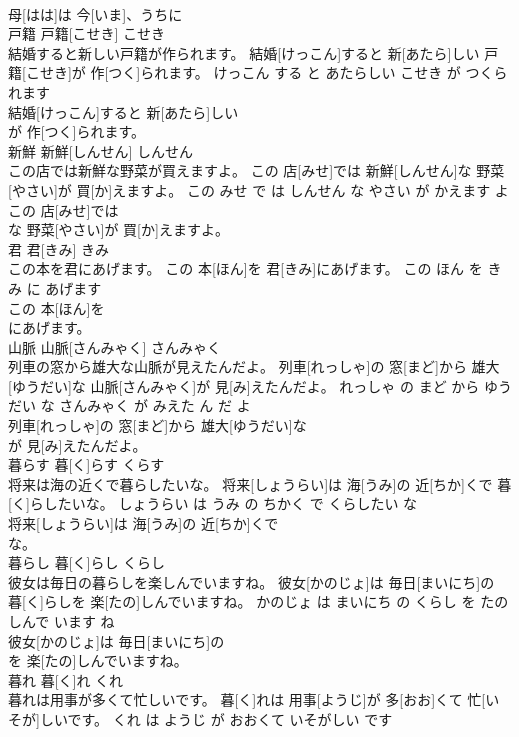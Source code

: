 \documentclass[8pt]{extreport}
\begin{document}
\begin{CJK}{UTF8}{min}
\\	母[はは]は 今[いま]、うちに
\\	戸籍	戸籍[こせき]	こせき	
\\	結婚すると新しい戸籍が作られます。	結婚[けっこん]すると 新[あたら]しい 戸籍[こせき]が 作[つく]られます。	けっこん する と あたらしい こせき が つくられます	
\\	結婚[けっこん]すると 新[あたら]しい
\\	が 作[つく]られます。			
\\	新鮮	新鮮[しんせん]	しんせん	
\\	この店では新鮮な野菜が買えますよ。	この 店[みせ]では 新鮮[しんせん]な 野菜[やさい]が 買[か]えますよ。	この みせ で は しんせん な やさい が かえます よ	
\\	この 店[みせ]では
\\	な 野菜[やさい]が 買[か]えますよ。			
\\	君	君[きみ]	きみ	
\\	この本を君にあげます。	この 本[ほん]を 君[きみ]にあげます。	この ほん を きみ に あげます	
\\	この 本[ほん]を
\\	にあげます。			
\\	山脈	山脈[さんみゃく]	さんみゃく	
\\	列車の窓から雄大な山脈が見えたんだよ。	列車[れっしゃ]の 窓[まど]から 雄大[ゆうだい]な 山脈[さんみゃく]が 見[み]えたんだよ。	れっしゃ の まど から ゆうだい な さんみゃく が みえた ん だ よ	
\\	列車[れっしゃ]の 窓[まど]から 雄大[ゆうだい]な
\\	が 見[み]えたんだよ。			
\\	暮らす	暮[く]らす	くらす	
\\	将来は海の近くで暮らしたいな。	将来[しょうらい]は 海[うみ]の 近[ちか]くで 暮[く]らしたいな。	しょうらい は うみ の ちかく で くらしたい な	
\\	将来[しょうらい]は 海[うみ]の 近[ちか]くで
\\	な。			
\\	暮らし	暮[く]らし	くらし	
\\	彼女は毎日の暮らしを楽しんでいますね。	彼女[かのじょ]は 毎日[まいにち]の 暮[く]らしを 楽[たの]しんでいますね。	かのじょ は まいにち の くらし を たのしんで います ね	
\\	彼女[かのじょ]は 毎日[まいにち]の
\\	を 楽[たの]しんでいますね。			
\\	暮れ	暮[く]れ	くれ	
\\	暮れは用事が多くて忙しいです。	暮[く]れは 用事[ようじ]が 多[おお]くて 忙[いそが]しいです。	くれ は ようじ が おおくて いそがしい です	

\end{CJK}
\end{document}
